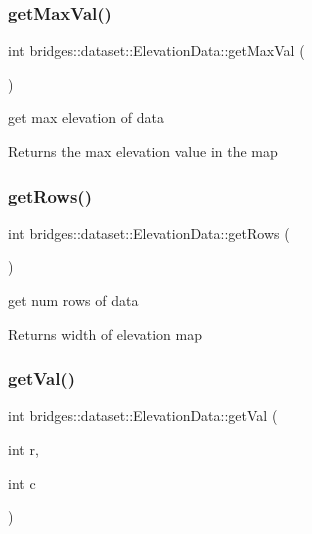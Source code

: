 \subsubsection{\texorpdfstring{get\+Max\+Val()}{getMaxVal()}}
{\footnotesize\ttfamily int bridges\+::dataset\+::\+Elevation\+Data\+::get\+Max\+Val (\begin{DoxyParamCaption}{ }\end{DoxyParamCaption})\hspace{0.3cm}{\ttfamily [inline]}}

get max elevation of data \begin{DoxyReturn}{Returns}
the max elevation value in the map 
\end{DoxyReturn}
\mbox{\label{classbridges_1_1dataset_1_1_elevation_data_a6e721fe05638f95e22aef75f25cd4ae0}} 
\subsubsection{\texorpdfstring{get\+Rows()}{getRows()}}
{\footnotesize\ttfamily int bridges\+::dataset\+::\+Elevation\+Data\+::get\+Rows (\begin{DoxyParamCaption}{ }\end{DoxyParamCaption})\hspace{0.3cm}{\ttfamily [inline]}}

get num rows of data

\begin{DoxyReturn}{Returns}
width of elevation map 
\end{DoxyReturn}
\mbox{\label{classbridges_1_1dataset_1_1_elevation_data_abdc18537c20774cf561d97987f1fb74a}} 
\subsubsection{\texorpdfstring{get\+Val()}{getVal()}}
{\footnotesize\ttfamily int bridges\+::dataset\+::\+Elevation\+Data\+::get\+Val (\begin{DoxyParamCaption}\item[{int}]{r,  }\item[{int}]{c }\end{DoxyParamCaption})\hspace{0.3cm}{\ttfamily [inline]}}

